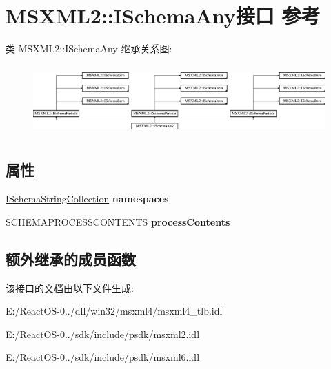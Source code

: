 \hypertarget{interface_m_s_x_m_l2_1_1_i_schema_any}{}\section{M\+S\+X\+M\+L2\+:\+:I\+Schema\+Any接口 参考}
\label{interface_m_s_x_m_l2_1_1_i_schema_any}
类 M\+S\+X\+M\+L2\+:\+:I\+Schema\+Any 继承关系图\+:\begin{figure}[H]
\begin{center}
\leavevmode
\includegraphics[height=2.745098cm]{interface_m_s_x_m_l2_1_1_i_schema_any}
\end{center}
\end{figure}
\subsection*{属性}
\begin{DoxyCompactItemize}
\item 
\mbox{\label{interface_m_s_x_m_l2_1_1_i_schema_any_a47d8d12b4b72ca4204408916575077b9}} 
\hyperlink{interface_m_s_x_m_l2_1_1_i_schema_string_collection}{I\+Schema\+String\+Collection} {\bfseries namespaces}
\item 
\mbox{\label{interface_m_s_x_m_l2_1_1_i_schema_any_ae7a712757cb91d0fafbea8c25b45714f}} 
S\+C\+H\+E\+M\+A\+P\+R\+O\+C\+E\+S\+S\+C\+O\+N\+T\+E\+N\+TS {\bfseries process\+Contents}
\end{DoxyCompactItemize}
\subsection*{额外继承的成员函数}


该接口的文档由以下文件生成\+:\begin{DoxyCompactItemize}
\item 
E\+:/\+React\+O\+S-\/0../dll/win32/msxml4/msxml4\+\_\+tlb.\+idl\item 
E\+:/\+React\+O\+S-\/0../sdk/include/psdk/msxml2.\+idl\item 
E\+:/\+React\+O\+S-\/0../sdk/include/psdk/msxml6.\+idl\end{DoxyCompactItemize}
